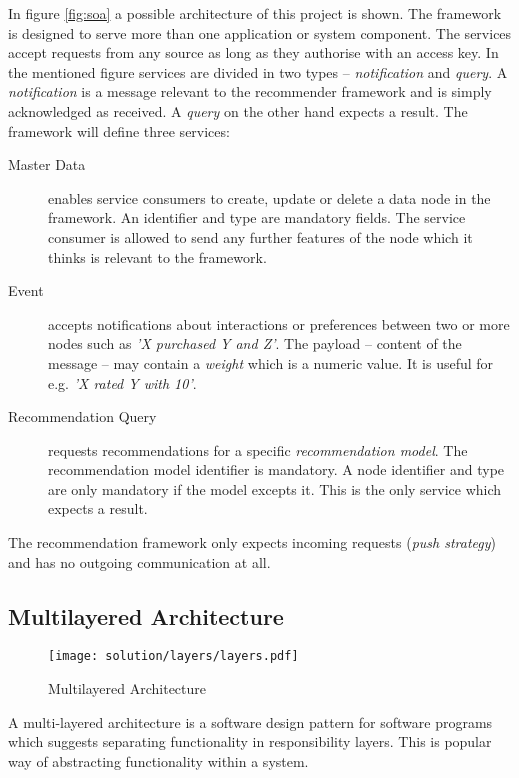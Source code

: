 In figure \ref{fig:soa} a possible architecture of this project is shown. The framework is designed to serve more than one application or system component. The services accept requests from any source as long as they authorise with an access key. In the mentioned figure services are divided in two types -- \emph{notification} and \emph{query}. A \emph{notification} is a message relevant to the recommender framework and is simply acknowledged as received. A \emph{query} on the other hand expects a result. The framework will define three services:

\begin{description}
    \item[Master Data] enables service consumers to create, update or delete a data node in the framework. An identifier and type are mandatory fields. The service consumer is allowed to send any further features of the node which it thinks is relevant to the framework.
    \item[Event] accepts notifications about interactions or preferences between two or more nodes such as \emph{'X purchased Y and Z'}. The payload -- content of the message -- may contain a \emph{weight} which is a numeric value. It is useful for e.g. \emph{'X rated Y with 10'}.
    \item[Recommendation Query] requests recommendations for a specific \emph{recommendation model}. The recommendation model identifier is mandatory. A node identifier and type are only mandatory if the model excepts it. This is the only service which expects a result.
\end{description}

The recommendation framework only expects incoming requests (\emph{push strategy}) and has no outgoing communication at all.

\subsection{Multilayered Architecture}
\label{sol-design-layer}

\begin{figure}[ht]
    \texttt{[image: solution/layers/layers.pdf]}
    \caption{Multilayered Architecture}
    \label{fig:ntier}
\end{figure}

A multi-layered architecture is a software design pattern for software programs which suggests separating functionality in responsibility layers. This is popular way of abstracting functionality within a system.

